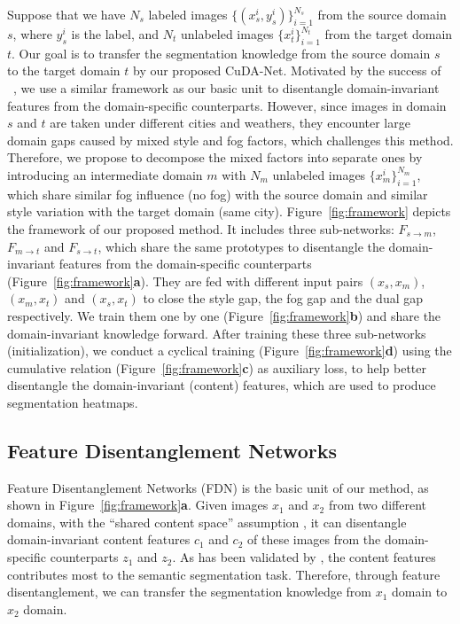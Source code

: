 \documentclass[10pt,twocolumn,letterpaper]{article}
\def\model{F}
\def\imd{m}
\def\td{t}
\begin{document}
Suppose that we have $N_s$ labeled images $\{(x_{s}^{i},y_{s}^{i})\}^{N_s}_{i=1}$ from the source domain $s$, 
where $y_{s}^i$ is the label,
and $N_{\td}$ unlabeled images
$\{x_{\td}^{i}\}^{N_{\td}}_{i=1}$ from the target domain $\td$. 
Our goal is to transfer the segmentation knowledge from the source domain $s$ to the target domain $\td$ by our proposed CuDA-Net.
Motivated by the success of ~\cite{chang2019all}, we use a similar framework as our basic unit to disentangle domain-invariant features from the domain-specific counterparts.
However, since images in domain $s$ and $\td$ are taken under different cities and weathers, they encounter large domain gaps caused by mixed style and fog factors, which challenges this method.
Therefore, we propose to decompose the mixed factors into separate ones by introducing an intermediate domain $\imd$ with $N_{\imd}$ unlabeled images $\{x_{\imd}^{i}\}^{N_{\imd}}_{i=1}$, which share similar fog influence (no fog) with the source domain and similar style variation with the target domain (same city).
Figure~\ref{fig:framework} depicts the framework of our proposed method. 
It includes three sub-networks: 
$\model_{s \rightarrow \imd}$, 
$\model_{\imd \rightarrow \td}$ 
and $\model_{s \rightarrow \td}$, 
which share the same prototypes to disentangle the domain-invariant features from the domain-specific counterparts (Figure~\ref{fig:framework}\textbf{a}).
They are fed with different input pairs $(x_s, x_\imd)$, $(x_\imd, x_\td)$ and $(x_s, x_\td)$ to close the style gap, the fog gap and the dual gap respectively.
We train them one by one (Figure~\ref{fig:framework}\textbf{b}) and share the domain-invariant knowledge forward. After training these three sub-networks (initialization), we conduct a cyclical training (Figure~\ref{fig:framework}\textbf{d}) using the cumulative relation (Figure~\ref{fig:framework}\textbf{c}) as auxiliary loss, to help better disentangle the domain-invariant (content) features, which are used to produce segmentation heatmaps.


\subsection{Feature Disentanglement Networks}
\label{sec:FDN}

Feature Disentanglement Networks (FDN) is the basic unit of our method, as shown in Figure~\ref{fig:framework}\textbf{a}. 
Given images $x_1$ and $x_2$ from two different domains, with the ``shared content space'' assumption \cite{huang2018multimodal}, it can disentangle domain-invariant content features $c_1$ and $c_2$ of these images from the domain-specific counterparts $z_1$ and $z_2$. As has been validated by \cite{chang2019all}, the content features contributes most to the semantic segmentation task. Therefore, through feature disentanglement, we can transfer the segmentation knowledge from $x_1$ domain to $x_2$ domain. 
\end{document}
